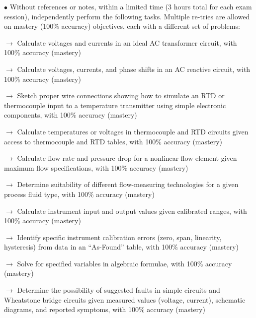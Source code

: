 \item{$\bullet$} Without references or notes, within a limited time (3 hours total for each exam session), independently perform the following tasks.  Multiple re-tries are allowed on mastery (100\% accuracy) objectives, each with a different set of problems:
\item\item{$\rightarrow$} Calculate voltages and currents in an ideal AC transformer circuit, with 100\% accuracy (mastery) 
\item\item{$\rightarrow$} Calculate voltages, currents, and phase shifts in an AC reactive circuit, with 100\% accuracy (mastery)
\item\item{$\rightarrow$} Sketch proper wire connections showing how to simulate an RTD or thermocouple input to a temperature transmitter using simple electronic components, with 100\% accuracy (mastery) 
\item\item{$\rightarrow$} Calculate temperatures or voltages in thermocouple and RTD circuits given access to thermocouple and RTD tables, with 100\% accuracy (mastery)
\item\item{$\rightarrow$} Calculate flow rate and pressure drop for a nonlinear flow element given maximum flow specifications, with 100\% accuracy (mastery) 
\item\item{$\rightarrow$} Determine suitability of different flow-measuring technologies for a given process fluid type, with 100\% accuracy (mastery)
\item\item{$\rightarrow$} Calculate instrument input and output values given calibrated ranges, with 100\% accuracy (mastery)
\item\item{$\rightarrow$} Identify specific instrument calibration errors (zero, span, linearity, hysteresis) from data in an ``As-Found'' table, with 100\% accuracy (mastery)
\item\item{$\rightarrow$} Solve for specified variables in algebraic formulae, with 100\% accuracy (mastery)
\item\item{$\rightarrow$} Determine the possibility of suggested faults in simple circuits and Wheatstone bridge circuits given measured values (voltage, current), schematic diagrams, and reported symptoms, with 100\% accuracy (mastery) 
